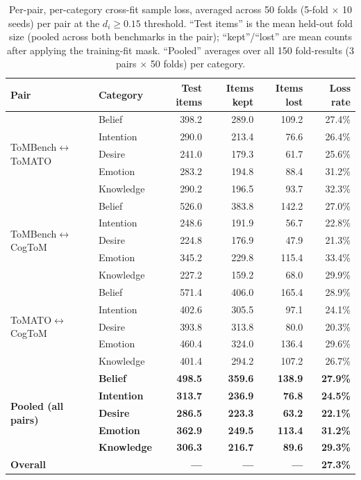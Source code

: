 \documentclass{article} %
\begin{document}
\begin{table}[h]
\centering
\small
\caption{Per-pair, per-category cross-fit sample loss, averaged across 50 folds (5-fold $\times$ 10 seeds) per pair at the $d_i \ge 0.15$ threshold. ``Test items'' is the mean held-out fold size (pooled across both benchmarks in the pair); ``kept''/``lost'' are mean counts after applying the training-fit mask. ``Pooled'' averages over all 150 fold-results (3 pairs $\times$ 50 folds) per category.}
\label{tab:sampleloss}
\begin{tabular}{llrrrr}
\toprule
Pair & Category & Test items & Items kept & Items lost & Loss rate \\
\midrule
\multirow{5}{*}{ToMBench$\leftrightarrow$ToMATO}
 & Belief    & 398.2 & 289.0 & 109.2 & 27.4\% \\
 & Intention & 290.0 & 213.4 & 76.6  & 26.4\% \\
 & Desire    & 241.0 & 179.3 & 61.7  & 25.6\% \\
 & Emotion   & 283.2 & 194.8 & 88.4  & 31.2\% \\
 & Knowledge & 290.2 & 196.5 & 93.7  & 32.3\% \\
\midrule
\multirow{5}{*}{ToMBench$\leftrightarrow$CogToM}
 & Belief    & 526.0 & 383.8 & 142.2 & 27.0\% \\
 & Intention & 248.6 & 191.9 & 56.7  & 22.8\% \\
 & Desire    & 224.8 & 176.9 & 47.9  & 21.3\% \\
 & Emotion   & 345.2 & 229.8 & 115.4 & 33.4\% \\
 & Knowledge & 227.2 & 159.2 & 68.0  & 29.9\% \\
\midrule
\multirow{5}{*}{ToMATO$\leftrightarrow$CogToM}
 & Belief    & 571.4 & 406.0 & 165.4 & 28.9\% \\
 & Intention & 402.6 & 305.5 & 97.1  & 24.1\% \\
 & Desire    & 393.8 & 313.8 & 80.0  & 20.3\% \\
 & Emotion   & 460.4 & 324.0 & 136.4 & 29.6\% \\
 & Knowledge & 401.4 & 294.2 & 107.2 & 26.7\% \\
\midrule
\multirow{5}{*}{\textbf{Pooled (all pairs)}}
 & \textbf{Belief}    & \textbf{498.5} & \textbf{359.6} & \textbf{138.9} & \textbf{27.9\%} \\
 & \textbf{Intention} & \textbf{313.7} & \textbf{236.9} & \textbf{76.8}  & \textbf{24.5\%} \\
 & \textbf{Desire}    & \textbf{286.5} & \textbf{223.3} & \textbf{63.2}  & \textbf{22.1\%} \\
 & \textbf{Emotion}   & \textbf{362.9} & \textbf{249.5} & \textbf{113.4} & \textbf{31.2\%} \\
 & \textbf{Knowledge} & \textbf{306.3} & \textbf{216.7} & \textbf{89.6}  & \textbf{29.3\%} \\
\midrule
\multicolumn{2}{l}{\textbf{Overall}} & \textbf{---} & \textbf{---} & \textbf{---} & \textbf{27.3\%} \\
\bottomrule
\end{tabular}
\end{table}
 
\end{document}
